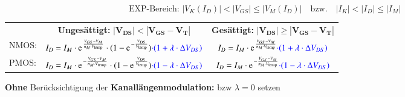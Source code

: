 \[ \boxed{ \text{EXP-Bereich: } |V_K(I_D)| < |V_{GS}| \leq |V_M(I_D)| \quad \text{bzw.} \quad |I_K| < |I_D| \leq |I_M| } \]  %


\resizebox{\columnwidth}{!}
{
    \renewcommand{\arraystretch}{1.5}
    \begin{tabular}{@{}l c | c@{}}
                & \textbf{Ungesättigt:} \quad $\bm{| V_{DS} | < | V_{GS} - V_T |}$                                                                                                  & \textbf{Gesättigt:} \quad $\bm{| V_{DS} | \geq | V_{GS} - V_T |}$                                                     \\
        NMOS:   & $I_D = I_M \cdot \e^{\frac{V_{GS} - V_M}{n_M \cdot V_\text{temp}}} \cdot (1 - \e^{-\frac{V_{DS}}{V_\text{temp}}}) \cbl{\cdot (1 + \lambda \cdot \Delta V_{DS})}$  & $I_D = I_M \cdot \e^{\frac{V_{GS} - V_M}{n_M \cdot V_\text{temp}}} \cbl{\cdot (1 + \lambda \cdot \Delta V_{DS})}$     \\
        \midrule
        PMOS:   & $I_D = I_M \cdot \e^{- \frac{V_{GS} - V_M}{n_M \cdot V_\text{temp}}} \cdot (1 - \e^{\frac{V_{DS}}{V_\text{temp}}}) \cbl{\cdot (1 - \lambda \cdot \Delta V_{DS})}$ & $I_D = I_M \cdot \e^{- \frac{V_{GS} - V_M}{n_M \cdot V_\text{temp}}} \cbl{\cdot (1 - \lambda \cdot \Delta V_{DS})}$   \\
    \end{tabular}
    \renewcommand{\arraystretch}{1}
}

\medskip

\textbf{Ohne} Berücksichtigung der \textbf{Kanallängenmodulation:}  bzw $\lambda = 0$ setzen






